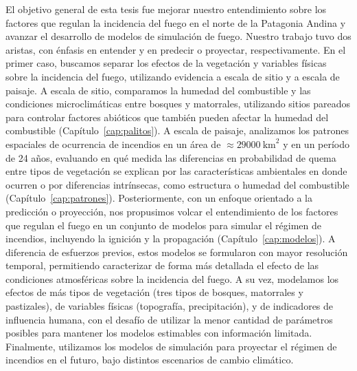 El objetivo general de esta tesis fue mejorar nuestro entendimiento sobre los factores que regulan la incidencia del fuego en el norte de la Patagonia Andina y avanzar el desarrollo de modelos de simulación de fuego. Nuestro trabajo tuvo dos aristas, con énfasis en entender y en predecir o proyectar, respectivamente. En el primer caso, buscamos separar los efectos de la vegetación y variables físicas sobre la incidencia del fuego, utilizando evidencia a escala de sitio y a escala de paisaje. A escala de sitio, comparamos la humedad del combustible y las condiciones microclimáticas entre bosques y matorrales, utilizando sitios pareados para controlar factores abióticos que también pueden afectar la humedad del combustible (Capítulo~\ref{cap:palitos}). A escala de paisaje, analizamos los patrones espaciales de ocurrencia de incendios en un área de $\approx 29000 \ \text{km}^2$ y en un período de 24 años, evaluando en qué medida las diferencias en probabilidad de quema entre tipos de vegetación se explican por las características ambientales en donde ocurren o por diferencias intrínsecas, como estructura o humedad del combustible (Capítulo~\ref{cap:patrones}). Posteriormente, con un enfoque orientado a la predicción o proyección, nos propusimos volcar el entendimiento de los factores que regulan el fuego en un conjunto de modelos para simular el régimen de incendios, incluyendo la ignición y la propagación (Capítulo~\ref{cap:modelos}). A diferencia de esfuerzos previos, estos modelos se formularon con mayor resolución temporal, permitiendo caracterizar de forma más detallada el efecto de las condiciones atmosféricas sobre la incidencia del fuego. A su vez, modelamos los efectos de más tipos de vegetación (tres tipos de bosques, matorrales y pastizales), de variables físicas (topografía, precipitación), y de indicadores de influencia humana, con el desafío de utilizar la menor cantidad de parámetros posibles para mantener los modelos estimables con información limitada. Finalmente, utilizamos los modelos de simulación para proyectar el régimen de incendios en el futuro, bajo distintos escenarios de cambio climático.